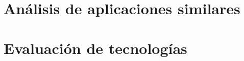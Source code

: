 
\section{Análisis de aplicaciones similares}


\section{Evaluación de tecnologías}\label{sec:evaluacion-tecnologias}

